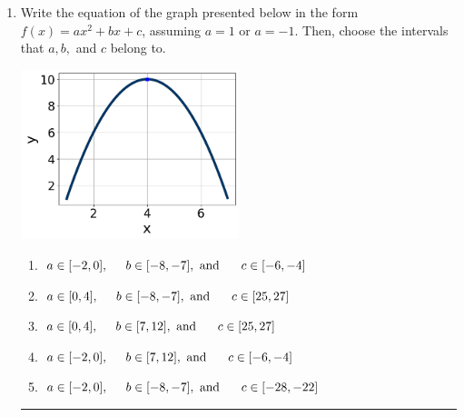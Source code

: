 \documentclass[14pt]{extbook}
\newcommand{\litem}[1]{\item#1\hspace*{-1cm}\rule{\textwidth}{0.4pt}}
\begin{document}
\begin{enumerate}
{\begin{enumerate}[label=\Alph*.]
\end{enumerate} }
\litem{
Write the equation of the graph presented below in the form $f(x)=ax^2+bx+c$, assuming  $a=1$ or $a=-1$. Then, choose the intervals that $a, b,$ and $c$ belong to.
\begin{center}
    \includegraphics[width=0.5\textwidth]{../Figures/quadraticGraphToEquationB.png}
\end{center}
\begin{enumerate}[label=\Alph*.]
\item \( a \in [-2, 0], \hspace*{5mm} b \in [-8, -7], \text{ and } \hspace*{5mm} c \in [-6, -4] \)
\item \( a \in [0, 4], \hspace*{5mm} b \in [-8, -7], \text{ and } \hspace*{5mm} c \in [25, 27] \)
\item \( a \in [0, 4], \hspace*{5mm} b \in [7, 12], \text{ and } \hspace*{5mm} c \in [25, 27] \)
\item \( a \in [-2, 0], \hspace*{5mm} b \in [7, 12], \text{ and } \hspace*{5mm} c \in [-6, -4] \)
\item \( a \in [-2, 0], \hspace*{5mm} b \in [-8, -7], \text{ and } \hspace*{5mm} c \in [-28, -22] \)

\end{enumerate} }
\end{enumerate}
\end{document}
